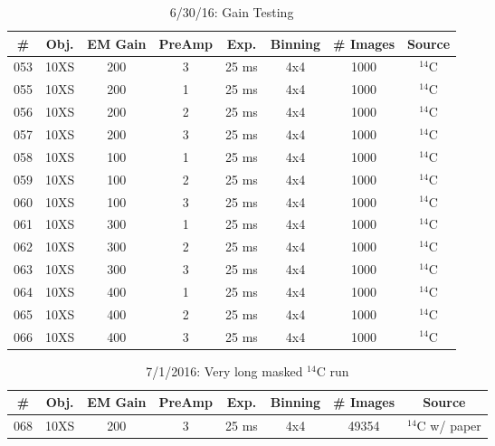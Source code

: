 \documentclass[12pt]{amsart}
\begin{document}
\begin{table}[!htbp]
	\centering
	\caption{6/30/16: Gain Testing}
	\label{tab:table10}
	\hspace*{-1cm}
	\begin{tabular}{cccccccc}
	\toprule
	\# & Obj. & EM Gain & PreAmp & Exp. & Binning & \# Images & Source\\
	\midrule
	053 & 10XS & 200 & 3 & 25 ms & 4x4 & 1000 & $^{14}$C\\
	055 & 10XS & 200 & 1 & 25 ms & 4x4 & 1000 & $^{14}$C\\
	056 & 10XS & 200 & 2 & 25 ms & 4x4 & 1000 & $^{14}$C\\
	057 & 10XS & 200 & 3 & 25 ms & 4x4 & 1000 & $^{14}$C\\
	058 & 10XS & 100 & 1 & 25 ms & 4x4 & 1000 & $^{14}$C\\
	059 & 10XS & 100 & 2 & 25 ms & 4x4 & 1000 & $^{14}$C\\
	060 & 10XS & 100 & 3 & 25 ms & 4x4 & 1000 & $^{14}$C\\
	061 & 10XS & 300 & 1 & 25 ms & 4x4 & 1000 & $^{14}$C\\
	062 & 10XS & 300 & 2 & 25 ms & 4x4 & 1000 & $^{14}$C\\
	063 & 10XS & 300 & 3 & 25 ms & 4x4 & 1000 & $^{14}$C\\
	064 & 10XS & 400 & 1 & 25 ms & 4x4 & 1000 & $^{14}$C\\
	065 & 10XS & 400 & 2 & 25 ms & 4x4 & 1000 & $^{14}$C\\
	066 & 10XS & 400 & 3 & 25 ms & 4x4 & 1000 & $^{14}$C\\
	\bottomrule
	\end{tabular}
	\hspace*{-1cm}
\end{table}

\begin{table}[!htbp]
	\centering
	\caption{7/1/2016: Very long masked $^{14}$C run}
	\label{tab:table11}
	\hspace*{-1cm}
	\begin{tabular}{cccccccc}
	\toprule
	\# & Obj. & EM Gain & PreAmp & Exp. & Binning & \# Images & Source\\
	\midrule
	068 & 10XS & 200 & 3 & 25 ms & 4x4 & 49354 & $^{14}$C w/ paper\\
	\bottomrule
	\end{tabular}
	\hspace*{-1cm}
\end{table}
\end{document}
